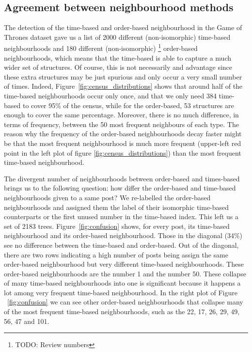 \documentclass[conference]{IEEEtran}
\begin{document}
\subsection{Agreement between neighbourhood methods}
The detection of the time-based and order-based neighbourhood in the Game of Thrones dataset gave us a list of 2000 different (non-isomorphic) time-based neighbourhoods and 180 different (non-isomorphic) \footnote{TODO: Review numbers} order-based neighbourhoods, which means that the time-based is able to capture a much wider set of structures. Of course, this is not necessarily and advantage since these extra structures may be just spurious and only occur a very small number of times. Indeed, Figure~\ref{fig:census_distributions} shows that around half of the time-based neighbourhoods occur only once, and that we only need 384 time-based to cover 95\% of the census, while for the order-based, 53 structures are enough to cover the same percentage. Moreover, there is no much difference, in terms of frequency, between the 50 most frequent neighbours of each type. The reason why the frequency of the order-based neighbourhoods decay faster might be that the most frequent neighbourhood is much more frequent (upper-left red point in the left plot of figure \ref{fig:census_distributions}) than the most frequent time-based neighbourhood.  


The divergent number of neighbourhoods between order-based and times-based brings us to the following question:  how differ the order-based and time-based neighbourhoods given to a same post? We re-labelled the order-based neighbourhoods and assigned them the label of their isomorphic time-based counterparts or the first unused number in the time-based index. This left us a set of 2183 trees. Figure~\ref{fig:confusion} shows, for every post, its time-based neighbourhood and its order-based neighbourhood. Those in the diagonal (34\%) see no difference between the time-based and order-based. Out of the diagonal, there are two rows indicating a high number of posts being assign the same order-based neighbourhood but very different time-based neighbourhoods. These order-based neighbourhoods are the number 1 and the number 50. These collapse of many time-based neighbourhoods into one is significant because it happens a lot among very frequent time-based neighbourhood. In the right plot of Figure ~\ref{fig:confusion} we can see other order-based neighbourhoods that collapse many of the most frequent time-based neighbourhoods, such as the 22, 17, 26, 29, 49, 56, 47 and 101. 
\end{document}

